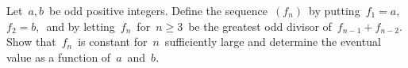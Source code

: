 Let $\, a,b \,$ be odd positive integers.  Define the sequence $\, (f_n ) \,$ by putting $\, f_1 = a,$ $f_2 = b, \,$ and by letting $\, f_n \,$ for $\, n \geq 3 \,$ be the greatest odd divisor of $\, f_{n-1} + f_{n-2}$.  Show that $\, f_n \,$ is constant for $\, n \,$ sufficiently large and determine the eventual value as a function of $\, a \,$ and $\, b$.